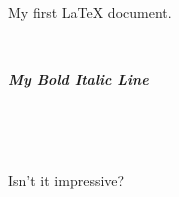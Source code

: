 \documentclass[12pt,a4paper]{article}
\begin{document}
 

My first \LaTeX{} document.

 

{

\large

\textbf{ \textit{ My Bold Italic Line} }

}

 

 

Isn't it impressive?

 
\end{document}
